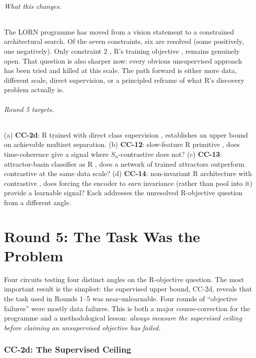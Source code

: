 \documentclass[10pt, twocolumn, a4paper]{article}
\newcommand{\Sn}{S_n}
\begin{document}
\paragraph{What this changes.}
The LORN programme has moved from a vision statement to a constrained architectural search. Of the seven constraints, six are resolved (some positively, one negatively). Only constraint 2 ,  R's training objective ,  remains genuinely open. That question is also sharper now: every obvious unsupervised approach has been tried and killed at this scale. The path forward is either more data, different scale, direct supervision, or a principled reframe of what R's discovery problem actually is.

\paragraph{Round 5 targets.}
(a) \textbf{CC-2d}: R trained with direct class supervision ,  establishes an upper bound on achievable multiset separation. (b) \textbf{CC-12}: slow-feature R primitive ,  does time-coherence give a signal where $\Sn$-contrastive does not? (c) \textbf{CC-13}: attractor-basin classifier as R ,  does a network of trained attractors outperform contrastive at the same data scale? (d) \textbf{CC-14}: non-invariant R architecture with contrastive ,  does forcing the encoder to \emph{earn} invariance (rather than pool into it) provide a learnable signal? Each addresses the unresolved R-objective question from a different angle.


\part*{Round 5: The Task Was the Problem}

Four circuits testing four distinct angles on the R-objective question. The most important result is the simplest: the supervised upper bound, CC-2d, reveals that the task used in Rounds 1--5 was near-unlearnable. Four rounds of ``objective failures'' were mostly data failures. This is both a major course-correction for the programme and a methodological lesson: \emph{always measure the supervised ceiling before claiming an unsupervised objective has failed}.

\section{CC-2d: The Supervised Ceiling}
\end{document}

